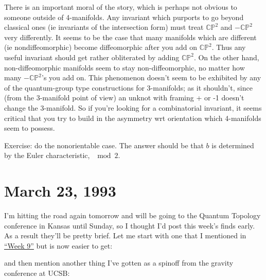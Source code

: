 \documentclass{article}
\def\tightlist{}
\renewcommand{\texttt}[1]{%
  \begingroup
  \ttfamily
  \begingroup\lccode`~=`/\lowercase{\endgroup\def~}{/\discretionary{}{}{}}%
  \begingroup\lccode`~=`[\lowercase{\endgroup\def~}{[\discretionary{}{}{}}%
  \begingroup\lccode`~=`.\lowercase{\endgroup\def~}{.\discretionary{}{}{}}%
  \catcode`/=\active\catcode`[=\active\catcode`.=\active
  \scantokens{#1\noexpand}%
  \endgroup
}
\begin{document}
There is an important moral of the story, which is perhaps not obvious
to someone outside of 4-manifolds. Any invariant which purports to go
beyond classical ones (ie invariants of the intersection form) must
treat \(\mathbb{CP}^2\) and \(-\mathbb{CP}^2\) very differently. It
seems to be the case that many manifolds which are different (ie
nondiffeomorphic) become diffeomorphic after you add on
\(\mathbb{CP}^2\). Thus any useful invariant should get rather
obliterated by adding \(\mathbb{CP}^2\). On the other hand,
non-diffeomorphic manifolds seem to stay non-diffeomorphic, no matter
how many \(-\mathbb{CP}^2\)'s you add on. This phenomenon doesn't seem
to be exhibited by any of the quantum-group type constructions for
3-manifolds; as it shouldn't, since (from the 3-manifold point of view)
an unknot with framing + or -1 doesn't change the 3-manifold. So if
you're looking for a combinatorial invariant, it seems critical that you
try to build in the asymmetry wrt orientation which 4-manifolds seem to
possess.

Exercise: do the nonorientable case. The answer should be that \(b\) is
determined by the Euler characteristic, \(\mod 2\).
\hypertarget{week11}{%
\section{March 23, 1993}\label{week11}}

I'm hitting the road again tomorrow and will be going to the Quantum
Topology conference in Kansas until Sunday, so I thought I'd post this
week's finds early. As a result they'll be pretty brief. Let me start
with one that I mentioned in \protect\hyperlink{week9}{``Week 9''} but
is now easier to get:


and then mention another thing I've gotten as a spinoff from the gravity
conference at UCSB:

\end{document}
